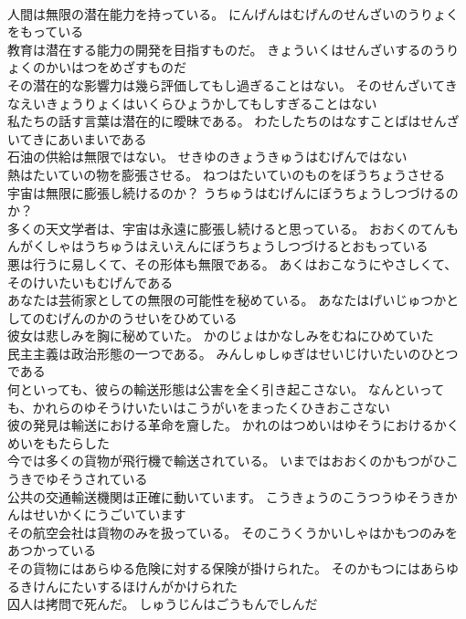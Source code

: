 \documentclass[8pt]{extreport}
\begin{document}
\begin{CJK}{UTF8}{min}
\\	人間は無限の潜在能力を持っている。	にんげんはむげんのせんざいのうりょくをもっている 
\\	教育は潜在する能力の開発を目指すものだ。	きょういくはせんざいするのうりょくのかいはつをめざすものだ 
\\	その潜在的な影響力は幾ら評価してもし過ぎることはない。	そのせんざいてきなえいきょうりょくはいくらひょうかしてもしすぎることはない 
\\	私たちの話す言葉は潜在的に曖昧である。	わたしたちのはなすことばはせんざいてきにあいまいである 
\\	石油の供給は無限ではない。	せきゆのきょうきゅうはむげんではない 
\\	熱はたいていの物を膨張させる。	ねつはたいていのものをぼうちょうさせる 
\\	宇宙は無限に膨張し続けるのか？	うちゅうはむげんにぼうちょうしつづけるのか？ 
\\	多くの天文学者は、宇宙は永遠に膨張し続けると思っている。	おおくのてんもんがくしゃはうちゅうはえいえんにぼうちょうしつづけるとおもっている 
\\	悪は行うに易しくて、その形体も無限である。	あくはおこなうにやさしくて、そのけいたいもむげんである 
\\	あなたは芸術家としての無限の可能性を秘めている。	あなたはげいじゅつかとしてのむげんのかのうせいをひめている 
\\	彼女は悲しみを胸に秘めていた。	かのじょはかなしみをむねにひめていた 
\\	民主主義は政治形態の一つである。	みんしゅしゅぎはせいじけいたいのひとつである 
\\	何といっても、彼らの輸送形態は公害を全く引き起こさない。	なんといっても、かれらのゆそうけいたいはこうがいをまったくひきおこさない 
\\	彼の発見は輸送における革命を齎した。	かれのはつめいはゆそうにおけるかくめいをもたらした 
\\	今では多くの貨物が飛行機で輸送されている。	いまではおおくのかもつがひこうきでゆそうされている 
\\	公共の交通輸送機関は正確に動いています。	こうきょうのこうつうゆそうきかんはせいかくにうごいています 
\\	その航空会社は貨物のみを扱っている。	そのこうくうかいしゃはかもつのみをあつかっている 
\\	その貨物にはあらゆる危険に対する保険が掛けられた。	そのかもつにはあらゆるきけんにたいするほけんがかけられた 
\\	囚人は拷問で死んだ。	しゅうじんはごうもんでしんだ 

\end{CJK}
\end{document}
